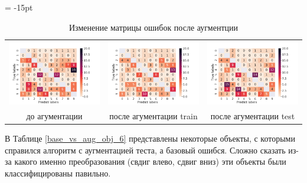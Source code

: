 \documentclass[12pt,fleqn]{article}
\begin{document}
\begin{table}[htb]
    \centering
    \tabcolsep = -15pt
    \begin{tabular}{ccc}
        \includegraphics[width=7cm]{task4.pdf} & \includegraphics[width=7cm]{task5_conf_mat.pdf} & \includegraphics[width=7cm]{task6.pdf}\\
        до агументации & после агументации train & после агументации test
    \end{tabular}
    \caption{Изменение матрицы ошибок после аугментции}
    \label{conf_matrix_aug_6}
\end{table}
В Таблице \ref{base_vs_aug_obj_6} представлены некоторые объекты, 
с которыми справился алгоритм с аугментацией теста, а базовый ошибся. Сложно сказать из-за какого именно преобразования
(свдиг влево, сдвиг вниз) эти объекты были классифицированы павильно.
\end{document}
